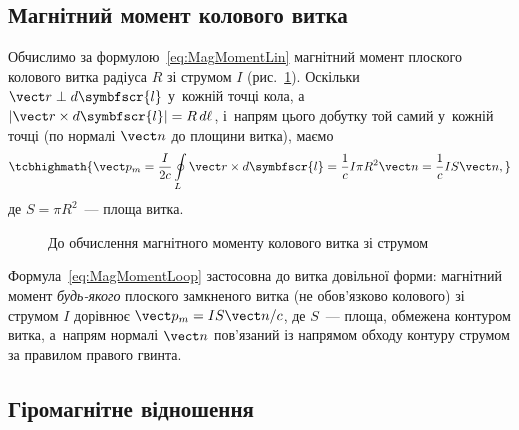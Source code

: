 \subsection*{Магнітний момент колового витка}


Обчислимо за формулою~\eqref{eq:MagMomentLin} магнітний момент плоского колового витка
радіуса $R$ зі струмом $I$ (рис.~\ref{pic:LoopMagMoment}). Оскільки $\vect r \perp
	d\symbfscr{l}$ у~кожній точці кола, а~$|\vect r\times d\symbfscr{l}| = R\, d\ell$, і~напрям
цього добутку той самий у~кожній точці (по нормалі $\vect n$ до площини витка), маємо
\begin{equation}\label{eq:MagMomentLoop}
	\tcbhighmath{
		\vect p_m = \frac{I}{2c}\oint\limits_L \vect r\times d\symbfscr{l} = \frac1c I\pi R^2\vect n = \frac1c IS\vect n,
	}
\end{equation}
де $S = \pi R^2$~--- площа витка.

\begin{figure}\centering
	\caption{До обчислення магнітного моменту колового витка зі
		струмом\label{pic:LoopMagMoment}}
\end{figure}

\begin{Attention}
	Формула~\eqref{eq:MagMomentLoop} застосовна до витка довільної форми: магнітний момент
	\emph{будь-якого} плоского замкненого витка (не обов'язково колового) зі струмом $I$
	дорівнює $\vect p_m = IS\vect n/c$, де $S$~--- площа, обмежена контуром витка,
	а~напрям нормалі $\vect n$ пов'язаний із напрямом обходу контуру струмом за правилом
	правого гвинта.
\end{Attention}


\subsection*{Гіромагнітне відношення}



